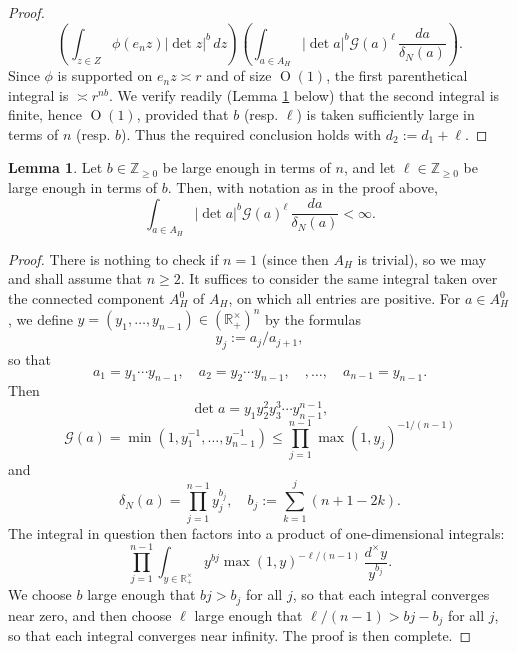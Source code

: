 \documentclass[reqno]{amsart}
\def\O{\operatorname{O}}
\theoremstyle{plain} \newtheorem{theorem} {Theorem}
\theoremstyle{definition} \newtheorem{definition} [theorem] {Definition}
\theoremstyle{itplain} %
\newtheorem{lemma}[theorem]{Lemma}
\numberwithin{equation}{section}
\numberwithin{theorem}{section}
\renewcommand{\geq}{\geqslant}
\renewcommand{\leq}{\leqslant}
\begin{document}
\begin{proof}
  \begin{equation*}
    \left(
      \int _{z \in Z} \phi (e _n z) |\det z|^b  \, d z
    \right)
    \left(
      \int _{a \in A_H} |\det a|^b \mathcal{G}(a)^{\ell} \, \frac{d a}{ \delta_N(a)}
    \right).
  \end{equation*}
  Since $\phi$ is supported on $e_n z \asymp r$ and of size $\O(1)$, the first parenthetical integral is $\asymp r^{n b}$.  We verify readily (Lemma \ref{lem:sub-gln:let-r-in} below) that the second integral is finite, hence $\O(1)$, provided that $b$ (resp. $\ell$) is taken sufficiently large in terms of $n$ (resp. $b$).  Thus the required conclusion holds with $d_2 := d_1 + \ell$.
\end{proof}

\begin{lemma}\label{lem:sub-gln:let-r-in}
  Let $b \in \mathbb{Z}_{\geq 0}$ be large enough in terms of $n$, and let $\ell \in \mathbb{Z}_{\geq 0}$ be large enough in terms of $b$.  Then, with notation as in the proof above,
  \begin{equation*}
    \int _{a \in A_H} |\det a|^b \mathcal{G}(a)^{\ell} \, \frac{d a}{ \delta_N(a)} < \infty.
  \end{equation*}
\end{lemma}
\begin{proof}
  There is nothing to check if $n = 1$ (since then $A_H$ is trivial), so we may and shall assume that $n \geq 2$.  It suffices to consider the same integral taken over the connected component $A_H^0$ of $A_H$, on which all entries are positive.  For $a \in A_H^0$, we define $y = (y_1,\dotsc,y_{n-1}) \in (\mathbb{R}^\times_+)^n$ by the formulas
\begin{equation*}
  y_j := a_j / a_{j+1},
\end{equation*}
so that
\begin{equation*}
  a_1 = y_1 \dotsb y_{n-1},
  \quad
  a_2 = y_2 \dotsb y_{n-1},
  \quad,
  \dotsc,
  \quad 
  a_{n-1} = y_{n-1}.
\end{equation*}
Then
\begin{equation*}
  \det a = y_1 y_2^2 y_3^3 \dotsb y_{n-1}^{n-1},
\end{equation*}
\begin{equation*}
  \mathcal{G}(a) =
  \min(1,y_1^{-1},\dotsc,y_{n-1}^{-1})
  \leq
  \prod_{j=1}^{n-1} \max(1, y_j)^{-1/(n-1)}
\end{equation*}
and
\begin{equation*}
  \delta_N(a) =  \prod_{j=1}^{n-1} y_j^{b_j}, \quad
  b_j := \sum_{k=1}^{j} (n + 1 - 2 k).
\end{equation*}
The integral in question then factors into a product of one-dimensional integrals:
\begin{equation*}
  \prod_{j=1}^{n-1}
  \int _{y \in \mathbb{R}^\times_+}
  y^{b j} \max(1, y)^{-\ell/(n-1)}
  \, \frac{d^\times y}{y^{b_j}}.
\end{equation*}
We choose $b$ large enough that $b j > b_j$ for all $j$, so that each integral converges near zero, and then choose $\ell$ large enough that $\ell/(n-1) > b j - b_j$ for all $j$, so that each integral converges near infinity.  The proof is then complete.
\end{proof}
\end{document}

